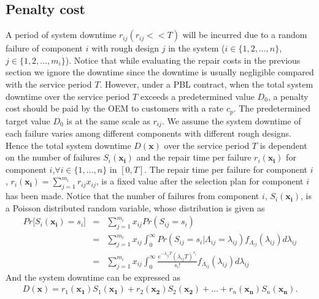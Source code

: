 \documentclass[preprint,12pt]{elsarticle}
\begin{document}
\subsection{Penalty cost}
A period of system downtime $r_{ij}(r_{ij}<<T)$ will be incurred due to a random failure of component $i$ with rough design $j$ in the system ($i \in \{1,2,...,n\}$, $j \in \{1,2,...,m_i\}$). Notice that while evaluating the repair costs in the previous section we ignore the downtime since the downtime is usually negligible compared with the service period $T$. However, under a PBL contract, when the total system downtime over the service period $T$ exceeds a predetermined value $D_0$, a penalty cost should be paid by the OEM to customers with a rate $c_p$. The predetermined target value $D_0$ is at the same scale as $r_{ij}$. We assume the system downtime of each failure varies among different components with different rough designs. Hence the total system downtime $D{(\boldsymbol{x})}$ over the service period $T$ is dependent on the number of failures $S_{i}(\boldsymbol{x_{i}})$ and the repair time per failure $r_{i}(\boldsymbol{x_{i}})$ for component $i$,$\forall i\in \{1,\dots,n\}$ in $[0,T]$. The repair time per failure for component $i$, $r_{i}(\boldsymbol{x_{i}})=\sum_{j=1}^{m_{i}}{r_{ij}x_{ij}}$, is a fixed value after the selection plan for component $i$ has been made. Notice that the number of failures from component $i$, $S_{i}(\boldsymbol{x_i})$, is a Poisson distributed random variable, whose distribution is given as
\begin{eqnarray}
Pr\bigg[S_{i}(\boldsymbol{x_i})=s_{i}\bigg] &=&\sum^{m_{i}}_{j=1}{x_{ij}Pr(S_{ij}=s_{i})} \nonumber\\
&=&\sum^{m_{i}}_{j=1}{x_{ij}\int^{\infty}_{0}Pr(S_{ij}=s_{i}|\Lambda_{ij}=\lambda_{ij})f_{\Lambda_{ij}}(\lambda_{ij})d\lambda_{ij}} \nonumber\\
&=&\sum^{m_{i}}_{j=1}{x_{ij}\int^{\infty}_{0}{\frac{e^{-\lambda_{ij}T}(\lambda_{ij}T)^{s_{i}}}{s_{i}!}f_{\Lambda_{ij}}(\lambda_{ij})}d\lambda_{ij}}
\end{eqnarray}
And the system downtime can be expressed as
\begin{eqnarray}
D(\boldsymbol{x})= r_{1}(\boldsymbol{x_{1}})S_{1}(\boldsymbol{x_{1}})+r_{2}(\boldsymbol{x_{2}})S_{2}(\boldsymbol{x_{2}})+\ldots+r_{n}(\boldsymbol{x_{n}})S_{n}(\boldsymbol{x_{n}}).
\label{D}
\end{eqnarray}
\end{document}
